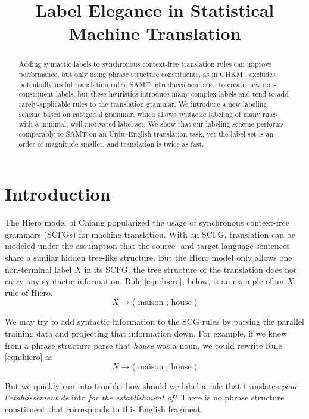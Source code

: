 \documentclass[a4paper]{article}
\author{
\anonymize{
Jonathan Weese \and Chris Callison-Burch \and Adam Lopez\\
Department of Computer Science\\
Human Language Technology Center of Excellence\\ %
Johns Hopkins University\\
Baltimore, MD 21218 USA\\
{\tt \{jonny,ccb,alopez\}@cs.jhu.edu}}
}
\title{Label Elegance in Statistical Machine Translation}
\begin{document}
\maketitle

\begin{abstract}
Adding syntactic labels to synchronous context-free translation rules can improve performance, but only using phrase structure constituents, as in GHKM \cite{ghkm}, excludes potentially useful translation rules. SAMT \cite{samt-wmt06} introduces heuristics to create new non-constituent labels, but these heuristics introduce many complex labels and tend to add rarely-applicable rules to the translation grammar. We introduce a new labeling scheme based on categorial grammar, which allows syntactic labeling of many rules with a minimal, well-motivated label set. We show that our labeling scheme performs comparably to SAMT on an Urdu--English translation task, yet the label set is an order of magnitude smaller, and translation is twice as fast.
\end{abstract}

\section{Introduction}

The Hiero model of Chiang  popularized the usage of synchronous context-free grammars (SCFGs) for machine translation. With an SCFG, translation can be modeled under the assumption that the source- and target-language sentences share a similar hidden tree-like structure. But the Hiero model only allows one non-terminal label $X$ in its SCFG; the tree structure of the translation does not carry any syntactic information. Rule \ref{eqn:hiero}, below, is an example of an $X$ rule of Hiero.
\begin{equation}
X \to \langle \textrm{ maison ; house } \rangle\label{eqn:hiero}
\end{equation}

We may try to add syntactic information to the SCG rules by parsing the parallel training data and projecting that information down. For example, if we knew from a phrase structure parse that {\em house} was a noun, we could rewrite Rule \ref{eqn:hiero} as
\begin{equation*}
N \to \langle \textrm{ maison ; house } \rangle
\end{equation*}

But we quickly run into trouble: how should we label a rule that translates {\em pour l'\'{e}tablissement de} into {\em for the establishment of}? There is no phrase structure constituent that corresponds to this English fragment.
\end{document}

